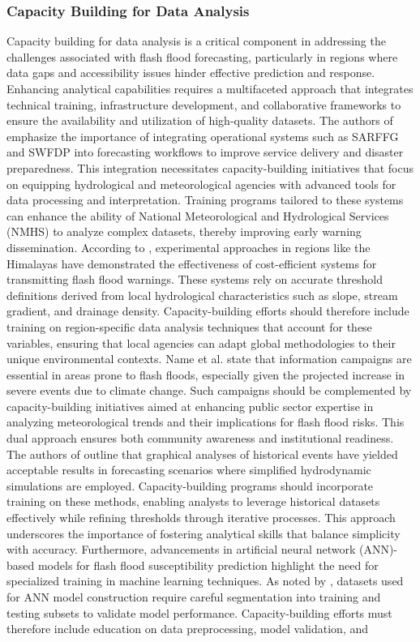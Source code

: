 \subsubsection{Capacity Building for Data Analysis}
Capacity building for data analysis is a critical component in addressing the challenges associated with flash flood forecasting, particularly in regions where data gaps and accessibility issues hinder effective prediction and response. Enhancing analytical capabilities requires a multifaceted approach that integrates technical training, infrastructure development, and collaborative frameworks to ensure the availability and utilization of high-quality datasets. The authors of \citep{Jubach2016} emphasize the importance of integrating operational systems such as SARFFG and SWFDP into forecasting workflows to improve service delivery and disaster preparedness. This integration necessitates capacity-building initiatives that focus on equipping hydrological and meteorological agencies with advanced tools for data processing and interpretation. Training programs tailored to these systems can enhance the ability of National Meteorological and Hydrological Services (NMHS) to analyze complex datasets, thereby improving early warning dissemination. According to \citep{AlRawas2024}, experimental approaches in regions like the Himalayas have demonstrated the effectiveness of cost-efficient systems for transmitting flash flood warnings. These systems rely on accurate threshold definitions derived from local hydrological characteristics such as slope, stream gradient, and drainage density. Capacity-building efforts should therefore include training on region-specific data analysis techniques that account for these variables, ensuring that local agencies can adapt global methodologies to their unique environmental contexts. Name et al. \citep{Laudan2020} state that information campaigns are essential in areas prone to flash floods, especially given the projected increase in severe events due to climate change. Such campaigns should be complemented by capacity-building initiatives aimed at enhancing public sector expertise in analyzing meteorological trends and their implications for flash flood risks. This dual approach ensures both community awareness and institutional readiness. The authors of \citep{Zanchetta2020} outline that graphical analyses of historical events have yielded acceptable results in forecasting scenarios where simplified hydrodynamic simulations are employed. Capacity-building programs should incorporate training on these methods, enabling analysts to leverage historical datasets effectively while refining thresholds through iterative processes. This approach underscores the importance of fostering analytical skills that balance simplicity with accuracy. Furthermore, advancements in artificial neural network (ANN)-based models for flash flood susceptibility prediction highlight the need for specialized training in machine learning techniques. As noted by \citep{Ngo2018}, datasets used for ANN model construction require careful segmentation into training and testing subsets to validate model performance. Capacity-building efforts must therefore include education on data preprocessing, model validation, and 